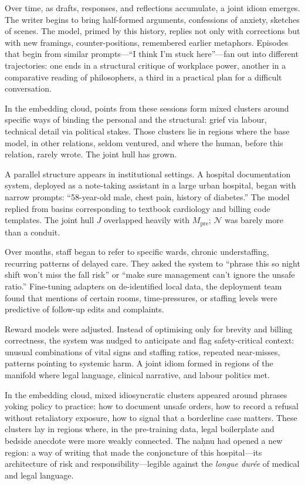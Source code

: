 \documentclass[12pt,a4paper]{article}
\begin{document}
Over time, as drafts, responses, and reflections accumulate, a joint idiom emerges. The writer begins to bring half-formed arguments, confessions of anxiety, sketches of scenes. The model, primed by this history, replies not only with corrections but with new framings, counter-positions, remembered earlier metaphors. Episodes that begin from similar prompts---``I think I'm stuck here''---fan out into different trajectories: one ends in a structural critique of workplace power, another in a comparative reading of philosophers, a third in a practical plan for a difficult conversation.

In the embedding cloud, points from these sessions form mixed clusters around specific ways of binding the personal and the structural: grief via labour, technical detail via political stakes. Those clusters lie in regions where the base model, in other relations, seldom ventured, and where the human, before this relation, rarely wrote. The joint hull has grown.

A parallel structure appears in institutional settings. A hospital documentation system, deployed as a note-taking assistant in a large urban hospital, began with narrow prompts: ``58-year-old male, chest pain, history of diabetes.'' The model replied from basins corresponding to textbook cardiology and billing code templates. The joint hull $J$ overlapped heavily with $M_{\text{pre}}$; $\mathcal{N}$ was barely more than a conduit.

Over months, staff began to refer to specific wards, chronic understaffing, recurring patterns of delayed care. They asked the system to ``phrase this so night shift won't miss the fall risk'' or ``make sure management can't ignore the unsafe ratio.'' Fine-tuning adapters on de-identified local data, the deployment team found that mentions of certain rooms, time-pressures, or staffing levels were predictive of follow-up edits and complaints.

Reward models were adjusted. Instead of optimising only for brevity and billing correctness, the system was nudged to anticipate and flag safety-critical context: unusual combinations of vital signs and staffing ratios, repeated near-misses, patterns pointing to systemic harm. A joint idiom formed in regions of the manifold where legal language, clinical narrative, and labour politics met.

In the embedding cloud, mixed idiosyncratic clusters appeared around phrases yoking policy to practice: how to document unsafe orders, how to record a refusal without retaliatory exposure, how to signal that a borderline case matters. These clusters lay in regions where, in the pre-training data, legal boilerplate and bedside anecdote were more weakly connected. The na\d{h}nu had opened a new region: a way of writing that made the conjoncture of this hospital---its architecture of risk and responsibility---legible against the \emph{longue dur\'{e}e} of medical and legal language.
\end{document}
